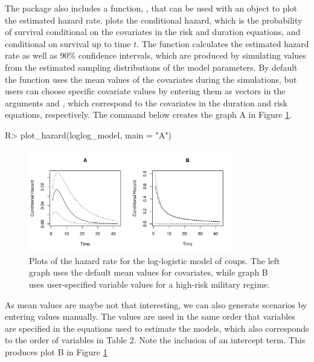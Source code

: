 \documentclass[article]{jss}
\begin{document}
The package also includes a function, , that can be
used with an  object to plot the estimated hazard rate.
 plots the conditional hazard, which is the
probability of survival conditional on the covariates in the risk and
duration equations, and conditional on survival up to time \(t\). The
function calculates the estimated hazard rate as well as 90\% confidence
intervals, which are produced by simulating values from the estimated
sampling distributions of the model parameters. By default the function
uses the mean values of the covariates during the simulations, but users
can choose specific covariate values by entering them as vectors in the
arguments  and , which correspond to the
covariates in the duration and risk equations, respectively. The command
below creates the graph A in Figure \ref{hazard-ex}.

\begin{CodeChunk}
\begin{CodeInput}
R> plot_hazard(loglog_model, main = "A")
\end{CodeInput}
\end{CodeChunk}

\begin{figure}
\begin{center}
\includegraphics[width=0.8\textwidth]{graphics/hazard-ex.pdf}
\caption{Plots of the hazard rate for the log-logistic model of coups. The left graph uses the default mean values for covariates, while graph B uses user-specified variable values for a high-risk military regime.}
\label{hazard-ex}
\end{center}
\end{figure}

As mean values are maybe not that interesting, we can also generate
scenarios by entering values manually. The values are used in the same
order that variables are specified in the equations used to estimate the
models, which also corresponds to the order of variables in Table 2.
Note the inclusion of an intercept term. This produces plot B in Figure
\ref{hazard-ex}
\end{document}
